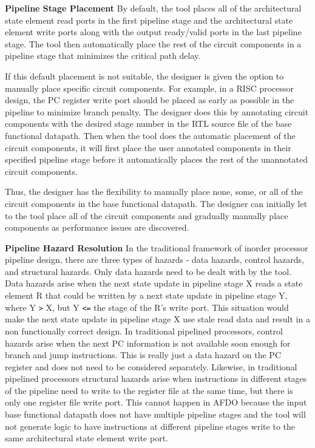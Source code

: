 {\bf Pipeline Stage Placement}
By default, the tool places all of the architectural state element read ports in the first pipeline stage and the architectural state element write ports along with the output ready/valid ports in the last pipeline stage. The tool then automatically place the rest of the circuit components in a pipeline stage that minimizes the critical path delay.

If this default placement is not suitable, the designer is given the option to manually place specific circuit components. For example, in a RISC processor design, the PC register write port should be placed as early as possible in the pipeline to minimize branch penalty. The designer does this by annotating circuit components with the desired stage number in the RTL source file of the base functional datapath. Then when the tool does the automatic placement of the circuit components, it will first place the user annotated components in their specified pipeline stage before it automatically places the rest of the unannotated circuit components. 

Thus, the designer has the flexibility to manually place none, some, or all of the circuit components in the base functional datapath. The designer can initially let to the tool place all of the circuit components and gradually manually place components as performance issues are discovered.

{\bf Pipeline Hazard Resolution}
In the traditional framework of inorder processor pipeline design, there are three types of hazards - data hazards, control hazards, and structural hazards. Only data hazards need to be dealt with by the tool. Data hazards arise when the next state update in pipeline stage X reads a state element R that could be written by a next state update in pipeline stage Y, where Y {\tt >} X, but Y {\tt <=} the stage of the R's write port. This situation would make the next state update in pipeline stage X use stale read data and result in a non functionally correct design. In traditional pipelined processors, control hazards arise when the next PC information is not available soon enough for branch and jump instructions. This is really just a data hazard on the PC register and does not need to be considered separately. Likewise, in traditional pipelined processors structural hazards arise when instructions in different stages of the pipeline need to write to the register file at the same time, but there is only one register file write port. This cannot happen in AFDO because the input base functional datapath does not have multiple pipeline stages and the tool will not generate logic to have instructions at different pipeline stages write to the same architectural state element write port.

